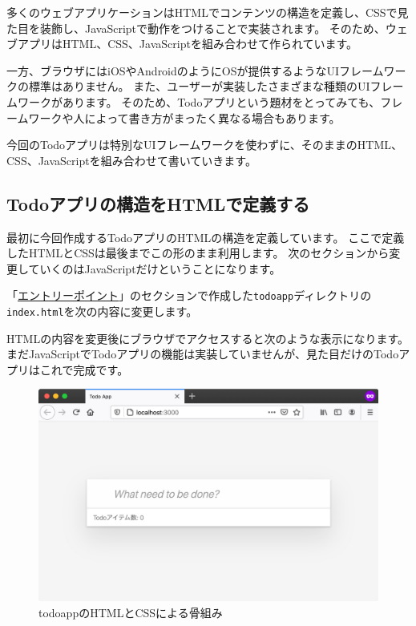 多くのウェブアプリケーションはHTMLでコンテンツの構造を定義し、CSSで見た目を装飾し、JavaScriptで動作をつけることで実装されます。
そのため、ウェブアプリはHTML、CSS、JavaScriptを組み合わせて作られています。

一方、ブラウザにはiOSやAndroidのようにOSが提供するようなUIフレームワークの標準はありません。
また、ユーザーが実装したさまざまな種類のUIフレームワークがあります。
そのため、Todoアプリという題材をとってみても、フレームワークや人によって書き方がまったく異なる場合もあります。

今回のTodoアプリは特別なUIフレームワークを使わずに、そのままのHTML、CSS、JavaScriptを組み合わせて書いていきます。

\hypertarget{todo-html}{%
\subsection{Todoアプリの構造をHTMLで定義する}\label{todo-html}}

最初に今回作成するTodoアプリのHTMLの構造を定義しています。
ここで定義したHTMLとCSSは最後までこの形のまま利用します。
次のセクションから変更していくのはJavaScriptだけということになります。

「\hyperlink{entrypoint_todo}{エントリーポイント}」のセクションで作成した\texttt{todoapp}ディレクトリの\texttt{index.html}を次の内容に変更します。



HTMLの内容を変更後にブラウザでアクセスすると次のような表示になります。
まだJavaScriptでTodoアプリの機能は実装していませんが、見た目だけのTodoアプリはこれで完成です。

\begin{figure}[h]
\centering
\includegraphics[width=120mm]{./fig/todo-html.pdf}
\caption{todoappのHTMLとCSSによる骨組み}
\end{figure}

